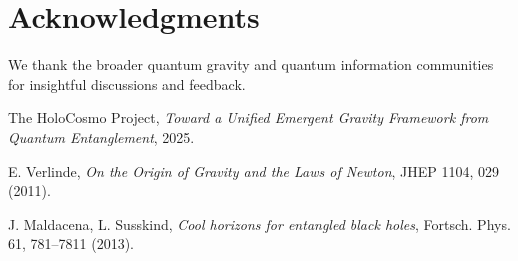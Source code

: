 \documentclass[12pt]{article}
\begin{document}
\section*{Acknowledgments}
We thank the broader quantum gravity and quantum information communities for insightful discussions and feedback.


\begin{thebibliography}{9}

The HoloCosmo Project, \emph{Toward a Unified Emergent Gravity Framework from Quantum Entanglement}, 2025.

E. Verlinde, \emph{On the Origin of Gravity and the Laws of Newton}, JHEP 1104, 029 (2011).

J. Maldacena, L. Susskind, \emph{Cool horizons for entangled black holes}, Fortsch. Phys. 61, 781–7811 (2013).

\end{thebibliography}
\end{document}
